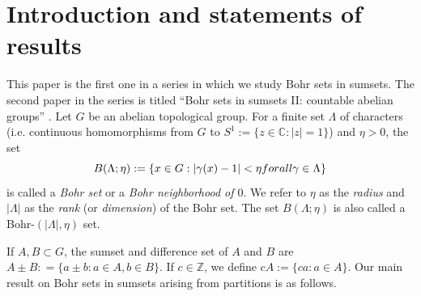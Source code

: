 \documentclass[10pt]{article}
\theoremstyle{definition}
\newcommand{\C}{\mathbb{C}}
\newcommand{\Z}{\mathbb{Z}}
\begin{document}
\section{Introduction and statements of results}







This paper is the first one in a series in which we study Bohr sets in sumsets. The second paper in the series is titled ``Bohr sets in sumsets II: countable abelian groups'' \cite{Griesmer-Le-Le-countable}.
Let $G$ be an abelian topological group. For a finite set $\Lambda$ of characters (i.e. continuous homomorphisms from $G$ to $S^1 := \{ z \in \C: |z|=1\}$) and $\eta > 0$, the set 
\begin{equation*} \label{eq:bohr1}
B(\Lambda; \eta) := \{ x \in G : | \gamma(x)-1 | < \eta \textup{ for all } \gamma \in \Lambda\}
\end{equation*} 
is called a \textit{Bohr set} or a \emph{Bohr neighborhood of $0$}. We refer to $\eta$ as the \textit{radius} and $|\Lambda|$ as the \textit{rank} (or \textit{dimension}) of the Bohr set. The set $B(\Lambda; \eta)$ is also called a Bohr-$(|\Lambda|, \eta)$ set. 

If $A, B \subset G$, the sumset and difference set of $A$ and $B$ are $A\pm B: = \{a\pm b: a \in A, b \in B \}$. If $c \in \Z$, we define $cA:=\{ ca: a \in A\}$.
\setcounter{theorem}{4}
Our main result on Bohr sets in sumsets arising from partitions is as follows. 

\end{document}
